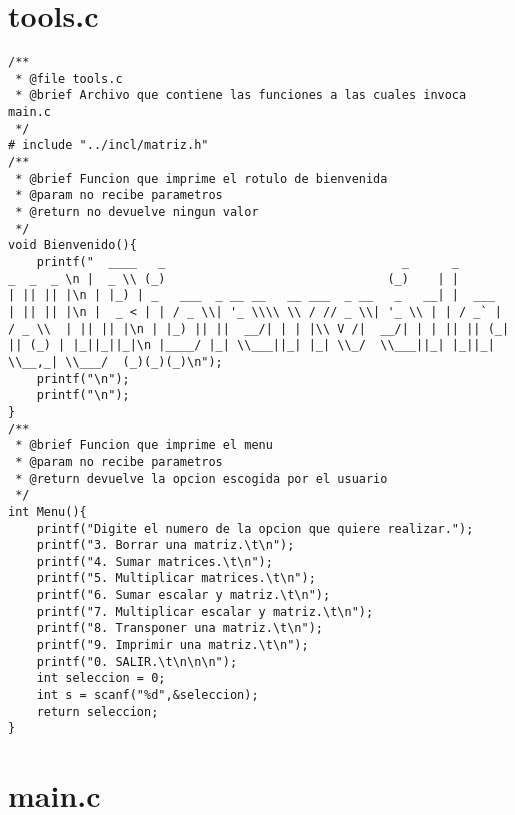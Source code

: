 \section{tools.c}
\begin{verbatim}
/**
 * @file tools.c
 * @brief Archivo que contiene las funciones a las cuales invoca main.c
 */
# include "../incl/matriz.h"
/**
 * @brief Funcion que imprime el rotulo de bienvenida
 * @param no recibe parametros
 * @return no devuelve ningun valor
 */
void Bienvenido(){
    printf("  ____   _                                 _      _          _  _  _ \n |  _ \\ (_)                               (_)    | |        | || || |\n | |_) | _   ___  _ __ __   __ ___  _ __   _   __| |  ___   | || || |\n |  _ < | | / _ \\| '_ \\\\ \\ / // _ \\| '_ \\ | | / _` | / _ \\  | || || |\n | |_) || ||  __/| | | |\\ V /|  __/| | | || || (_| || (_) | |_||_||_|\n |____/ |_| \\___||_| |_| \\_/  \\___||_| |_||_| \\__,_| \\___/  (_)(_)(_)\n"); 
    printf("\n");
    printf("\n");
}
/**
 * @brief Funcion que imprime el menu
 * @param no recibe parametros
 * @return devuelve la opcion escogida por el usuario
 */
int Menu(){
    printf("Digite el numero de la opcion que quiere realizar.");
    printf("3. Borrar una matriz.\t\n");
    printf("4. Sumar matrices.\t\n");
    printf("5. Multiplicar matrices.\t\n");
    printf("6. Sumar escalar y matriz.\t\n");
    printf("7. Multiplicar escalar y matriz.\t\n");
    printf("8. Transponer una matriz.\t\n");
    printf("9. Imprimir una matriz.\t\n");
    printf("0. SALIR.\t\n\n\n");
    int seleccion = 0;
    int s = scanf("%d",&seleccion);
    return seleccion;
}
\end{verbatim}

\section{main.c}

